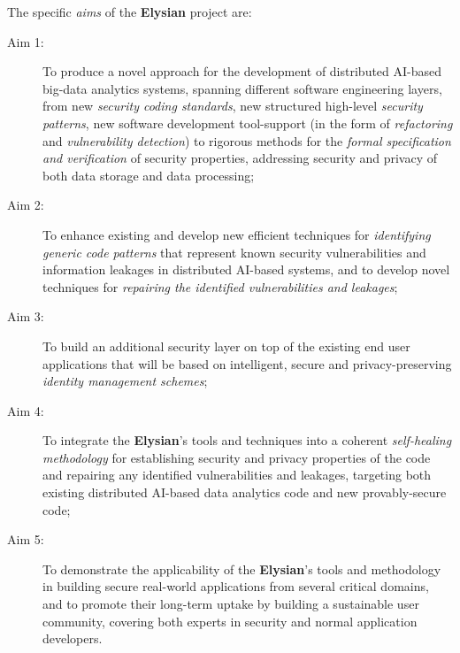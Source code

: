 \documentclass[a4paper,11pt]{article}
\newcommand{\project}[1]{\textbf{#1}\xspace}
\newcommand{\SECURITY}{\project{Elysian}}
\newcommand{\TheProject}{\SECURITY}
\begin{document}


The specific \emph{aims} of the \TheProject{} project are:

\begin{description}
\item[Aim 1:] To produce a novel approach for the development of distributed AI-based big-data analytics systems, spanning different software engineering layers, from new \emph{security coding standards}, new structured high-level \emph{security patterns}, new software development tool-support (in the form of \emph{refactoring} and \emph{vulnerability detection}) to rigorous methods for the \emph{formal specification and verification} of security properties, addressing security and privacy of both data storage and data processing;

\item[Aim 2:] To %
enhance existing and develop new efficient techniques for \emph{identifying generic code patterns} that
  represent known security vulnerabilities and information leakages in distributed AI-based systems, and to develop novel techniques for  
  \emph{repairing the identified vulnerabilities and leakages};

\item[Aim 3:] To build an additional security layer on top of the existing end user applications that will be based on intelligent, secure and privacy-preserving \emph{identity management schemes};

\item[Aim 4:] To integrate the \TheProject{}'s tools and techniques into a coherent \emph{self-healing methodology} for establishing
  security and privacy properties of the code and repairing any identified vulnerabilities and leakages, targeting both 
  existing distributed AI-based data analytics code and new provably-secure code;

\item[Aim 5:]  To demonstrate the applicability of the \TheProject{}'s tools and
 methodology in building secure real-world applications from 
 several critical %
 domains, and to promote their long-term uptake by building a sustainable user community,
 covering both experts in security and normal application developers.

\end{description}
\end{document}
